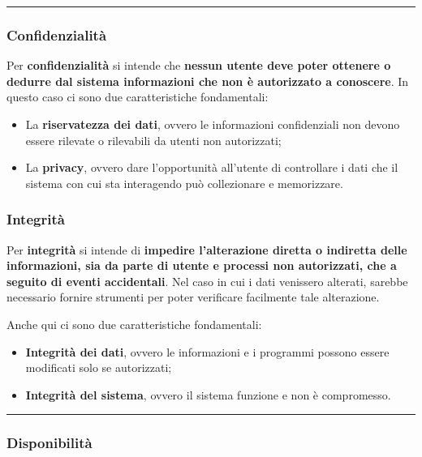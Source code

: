 \documentclass[a4paper]{article}
\newcommand{\longline}{\noindent\rule{\textwidth}{0.4pt}}
\begin{document}
	\longline
	
	\subsubsection{Confidenzialità}
	
	Per \textcolor{Red3}{\textbf{confidenzialità}} si intende che \textbf{nessun utente deve poter ottenere o dedurre dal sistema informazioni che non è autorizzato a conoscere}. In questo caso ci sono due caratteristiche fondamentali:
	\begin{itemize}
		\item La \textbf{riservatezza dei dati}, ovvero le informazioni confidenziali non devono essere rilevate o rilevabili da utenti non autorizzati;
		
		\item La \textbf{privacy}, ovvero dare l'opportunità all'utente di controllare i dati che il sistema con cui sta interagendo può collezionare e memorizzare.
	\end{itemize}\newpage
		
	\subsubsection{Integrità}
	
	Per \textcolor{Red3}{\textbf{integrità}} si intende di \textbf{impedire l'alterazione diretta o indiretta delle informazioni, sia da parte di utente e processi non autorizzati, che a seguito di eventi accidentali}. Nel caso in cui i dati venissero alterati, sarebbe necessario fornire strumenti per poter verificare facilmente tale alterazione.\newline
	
	\noindent
	Anche qui ci sono due caratteristiche fondamentali:
	\begin{itemize}
		\item \textbf{Integrità dei dati}, ovvero le informazioni e i programmi possono essere modificati solo se autorizzati;
		
		\item \textbf{Integrità del sistema}, ovvero il sistema funzione e non è compromesso.
	\end{itemize}

	\longline
	
	\subsubsection{Disponibilità}
	
\end{document}
